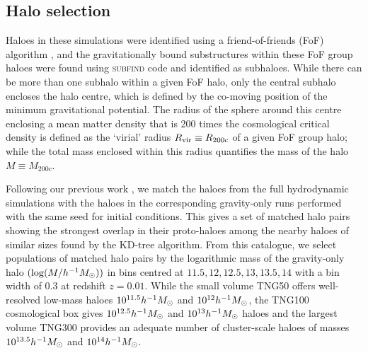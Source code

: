 \subsection{Halo selection}
\label{sec:methods-halopairsel}
Haloes in these simulations were identified using a friend-of-friends (FoF) algorithm \citep[see][for specifics]{2016A&C....15...72M,2019ComAC...6....2N}, and the gravitationally bound substructures within these FoF group haloes were found using \textsc{subfind} code \citep{2001MNRAS.328..726S} and identified as subhaloes. While there can be more than one subhalo within a given FoF halo, only the central subhalo encloses the halo centre, which is defined by the co-moving position of the minimum gravitational potential. The radius of the sphere around this centre enclosing a mean matter density that is 200 times the cosmological critical density is defined as the `virial' radius $R_{\rm vir}\equiv R_{\rm 200c}$ of a given FoF group halo; while the total mass enclosed within this radius quantifies the mass of the halo $M\equiv M_{200c}$.

Following our previous work \citep{2023Velmani&Paranjape}, we match the haloes from the full hydrodynamic simulations with the haloes in the corresponding gravity-only runs performed with the same seed for initial conditions. This gives a set of matched halo pairs showing the strongest overlap in their proto-haloes among the nearby haloes of similar sizes found by the KD-tree algorithm. From this catalogue, we select populations of matched halo pairs by the logarithmic mass of the gravity-only halo $(\log(M/h^{-1}M_{\odot}))$ in bins centred at $11.5, 12, 12.5, 13, 13.5, 14$ with a bin width of 0.3 at redshift $z=0.01$. While the small volume TNG50 offers well-resolved low-mass haloes $10^{11.5} h^{-1}M_{\odot}$ and $10^{12} h^{-1}M_{\odot}$, the TNG100 cosmological box gives $10^{12.5} h^{-1}M_{\odot}$ and $10^{13} h^{-1}M_{\odot}$ haloes and the largest volume TNG300 provides an adequate number of cluster-scale haloes of masses $10^{13.5} h^{-1}M_{\odot}$ and $10^{14} h^{-1}M_{\odot}$. 






   

